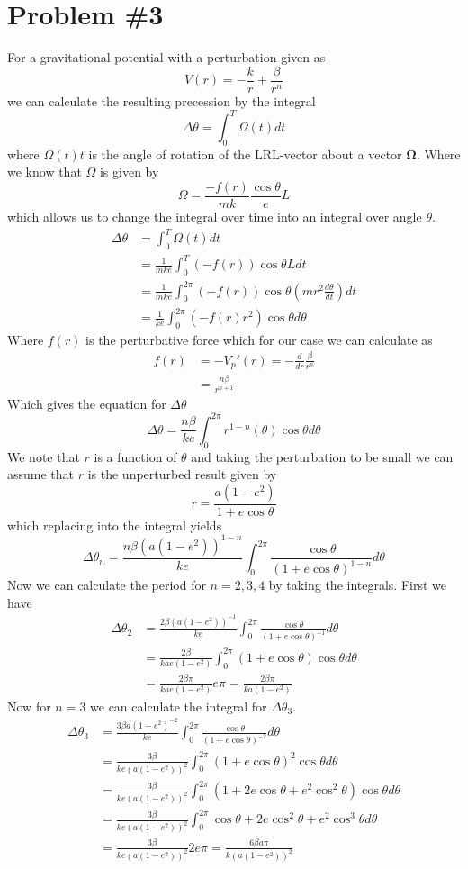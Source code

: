 \documentclass[11pt]{article}
\numberwithin{equation}{section}
\begin{document}
\section{Problem \#3}
For a gravitational potential with a perturbation given as
$$V(r) = -\frac{k}{r} + \frac{\beta}{r^n}$$
we can calculate the resulting precession by the integral
$$\Delta\theta = \int_{0}^{T}\Omega(t)dt$$
where $\Omega(t)t$ is the angle of rotation of the LRL-vector about a vector 
$\mathbf{\Omega}$. Where we know that $\Omega$ is given by
$$\Omega = \frac{-f(r)}{mk}\frac{\cos\theta}{e}L$$
which allows us to change the integral over time into an integral over angle $\theta$.
\begin{align*}
\Delta\theta &= \int_{0}^{T}\Omega(t)dt\\
&= \frac{1}{mke}\int_{0}^{T}(-f(r))\cos\theta Ldt\\
&= \frac{1}{mke}\int_{0}^{2\pi}(-f(r))\cos\theta\left(mr^2\frac{d\theta}{dt}\right)dt\\
&= \frac{1}{ke}\int_{0}^{2\pi}(-f(r)r^2)\cos\theta d\theta
\end{align*}
Where $f(r)$ is the perturbative force which for our case we can calculate as
\begin{align*}
f(r) &= -V_p'(r) = -\frac{d}{dr}\frac{\beta}{r^n}\\
&= \frac{n\beta}{r^{n+1}}
\end{align*}
Which gives the equation for $\Delta\theta$
$$\Delta\theta = \frac{n\beta}{ke}\int_{0}^{2\pi}r^{1-n}(\theta)\cos\theta d\theta$$
We note that $r$ is a function of $\theta$ and taking the perturbation to be small we can 
assume that $r$ is the unperturbed result given by
$$r = \frac{a(1-e^2)}{1+e\cos\theta}$$
which replacing into the integral yields
$$\Delta\theta_n = \frac{n\beta (a(1-e^2))^{1-n}}{ke}\int_{0}^{2\pi}\frac{\cos\theta}{(1+e\cos\theta)^{1-n}} d\theta$$
Now we can calculate the period for $n=2,3,4$ by taking the integrals. First we have
\begin{align*}
\Delta\theta_{2} &= \frac{2\beta (a(1-e^2))^{-1}}{ke}\int_{0}^{2\pi}\frac{\cos\theta}{(1+e\cos\theta)^{-1}} d\theta\\
&= \frac{2\beta }{kae(1-e^2)}\int_{0}^{2\pi}(1+e\cos\theta)\cos\theta d\theta\\
&= \frac{2\beta \pi}{kae(1-e^2)}e\pi = \frac{2\beta \pi}{ka(1-e^2)}
\end{align*}
Now for $n=3$ we can calculate the integral for $\Delta\theta_3$.
\begin{align*}
\Delta\theta_{3} &= \frac{3\beta a(1-e^2)^{-2}}{ke}\int_{0}^{2\pi}\frac{\cos\theta}{(1+e\cos\theta)^{-2}} d\theta\\
&= \frac{3\beta }{ke(a(1-e^2))^{2}}\int_{0}^{2\pi}(1+e\cos\theta)^{2}\cos\theta d\theta\\
&= \frac{3\beta }{ke(a(1-e^2))^{2}}\int_{0}^{2\pi}(1+2e\cos\theta+e^2\cos^2\theta)\cos\theta d\theta\\
&= \frac{3\beta }{ke(a(1-e^2))^{2}}\int_{0}^{2\pi}\cos\theta+2e\cos^2\theta+e^2\cos^3\theta d\theta\\
&= \frac{3\beta }{ke(a(1-e^2))^{2}}2e\pi = \frac{6\beta a\pi}{k(a(1-e^2))^{2}}
\end{align*}
\end{document}
